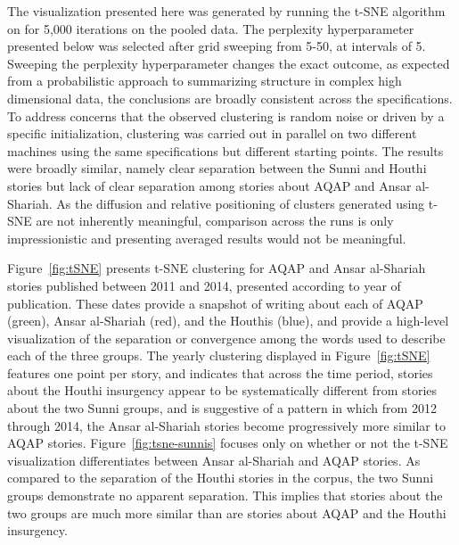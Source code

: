 The visualization presented here was generated by
running the t-SNE algorithm on for 5,000 iterations on the pooled
data. The perplexity hyperparameter presented below was selected after
grid sweeping from 5-50, at intervals of 5. Sweeping the perplexity
hyperparameter changes the exact outcome, as expected from a
probabilistic approach to summarizing structure in complex high
dimensional data, the conclusions are  broadly consistent across the
specifications. To address concerns that the observed clustering is random noise or driven by a specific
initialization, clustering was carried out in parallel on two
different machines using the same specifications but different
starting points. The results were broadly similar, namely  clear separation between the
Sunni and Houthi stories but lack of clear separation among stories
about AQAP and Ansar al-Shariah. As the diffusion and relative
positioning of clusters generated using t-SNE are not inherently
meaningful, comparison across the runs is only impressionistic and
presenting averaged results would not be meaningful.

Figure~\ref{fig:tSNE} presents t-SNE clustering for AQAP and Ansar
al-Shariah stories published between 2011 and 2014, presented
according to year of publication. These dates provide a snapshot of
writing about each of AQAP (green), Ansar al-Shariah (red), and the
Houthis (blue), and provide a high-level visualization of the
separation or convergence among the words used to describe each of the
three groups. The yearly clustering displayed in Figure~\ref{fig:tSNE}
features one point per story, and indicates that across the time
period, stories about the Houthi insurgency appear to be
systematically different from stories about the two Sunni groups, and
is suggestive of a pattern in which from 2012 through 2014, the Ansar
al-Shariah stories become progressively more similar to AQAP stories.
Figure~\ref{fig:tsne-sunnis} focuses only on whether or not the t-SNE
visualization differentiates between Ansar al-Shariah and AQAP
stories. As compared to the separation of the Houthi stories in the
corpus, the two Sunni groups demonstrate no apparent separation. This
implies that stories about the two groups are much more similar than
are stories about AQAP and the Houthi insurgency.   


